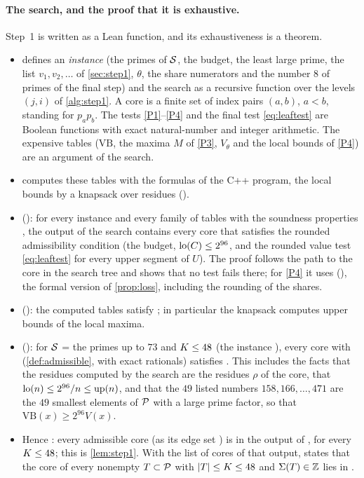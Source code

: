 \documentclass[11pt]{article}
\begin{document}
\paragraph{The search, and the proof that it is exhaustive.}
Step~1 is written as a Lean function, and its exhaustiveness is a theorem.
\begin{itemize}
\item {} defines an \emph{instance} (the primes of $\mathcal{S}$, the budget, the least large prime, the list $v_1,v_2,\dots$ of \cref{sec:step1}, $\theta$, the share numerators and the number $8$ of primes of the final step) and the search  as a recursive function over the levels $(j,i)$ of \cref{alg:step1}. A core is a finite set of index pairs $(a,b)$, $a<b$, standing for $p_ap_b$. The tests \ref{P1}--\ref{P4} and the final test \eqref{eq:leaftest} are Boolean functions with exact natural-number and integer arithmetic. The expensive tables ($\mathrm{VB}$, the maxima $M$ of \ref{P3}, $V_\theta$ and the local bounds of \ref{P4}) are an argument of the search.
\item {} computes these tables with the formulas of the C++ program, the local bounds by a knapsack over residues ().
\item {} (): for every instance and every family of tables with the soundness properties , the output of the search contains every core that satisfies the rounded admissibility condition  (the budget, $\operatorname{lo}(C)\le2^{96}$, and the rounded value test \eqref{eq:leaftest} for every upper segment of $U$). The proof follows the path to the core in the search tree and shows that no test fails there; for \ref{P4} it uses  (), the formal version of \cref{prop:loss}, including the rounding of the shares.
\item {} (): the computed tables satisfy ; in particular the knapsack computes upper bounds of the local maxima.
\item {} (): for $\mathcal{S}$ = the primes up to $73$ and $K\le48$ (the instance ), every core with  (\cref{def:admissible}, with exact rationals) satisfies . This includes the facts that the residues computed by the search are the residues $\rho$ of the core, that $\operatorname{lo}(n)\le2^{96}/n\le\operatorname{up}(n)$, and that the $49$ listed numbers $158,166,\dots,471$ are the $49$ smallest elements of $\mathcal{P}$ with a large prime factor, so that $\mathrm{VB}(x)\ge2^{96}V(x)$.
\item Hence : every admissible core (as its edge set ) is in the output of , for every $K\le48$; this is \cref{lem:step1}. With  the list of cores of that output,  states that the core of every nonempty $T\subset\mathcal{P}$ with $\lvert T\rvert\le K\le48$ and $\Sigma(T)\in\mathbb{Z}$ lies in .
\end{itemize}
\end{document}
